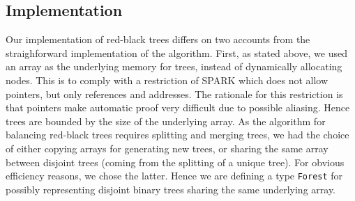 \documentclass{llncs}
\newcommand{\spark}{SPARK\xspace}
\begin{document}
\subsection{Implementation}
\label{sec-implementation}

Our implementation of red-black trees differs on two accounts from the
straighforward implementation of the algorithm. First, as stated above,
we used an array as the
underlying memory for trees, instead of dynamically allocating nodes. This is
to comply with a restriction of SPARK which does not allow pointers, but only
references and addresses. The rationale for this restriction is that pointers
make automatic proof very difficult due to possible aliasing. Hence trees are
bounded by the size of the underlying array. As the algorithm for balancing
red-black trees requires splitting and merging trees, we had the choice of
either copying arrays for generating new trees, or sharing the same array
between disjoint trees (coming from the splitting of a unique tree). For
obvious efficiency reasons, we chose the latter. Hence we are defining a type
\texttt{Forest} for possibly representing disjoint binary trees sharing the
same underlying array.


\end{document}
